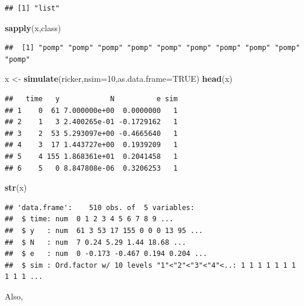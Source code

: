 \documentclass[]{article}
\newenvironment{Shaded}{\begin{snugshade}}{\end{snugshade}}
\newcommand{\KeywordTok}[1]{\textcolor[rgb]{0.13,0.29,0.53}{\textbf{#1}}}
\newcommand{\DataTypeTok}[1]{\textcolor[rgb]{0.13,0.29,0.53}{#1}}
\newcommand{\DecValTok}[1]{\textcolor[rgb]{0.00,0.00,0.81}{#1}}
\newcommand{\StringTok}[1]{\textcolor[rgb]{0.31,0.60,0.02}{#1}}
\newcommand{\OtherTok}[1]{\textcolor[rgb]{0.56,0.35,0.01}{#1}}
\newcommand{\NormalTok}[1]{#1}
\begin{document}
\begin{verbatim}
## [1] "list"
\end{verbatim}

\begin{Shaded}
\begin{Highlighting}[]
\KeywordTok{sapply}\NormalTok{(x,class)}
\end{Highlighting}
\end{Shaded}

\begin{verbatim}
##  [1] "pomp" "pomp" "pomp" "pomp" "pomp" "pomp" "pomp" "pomp" "pomp" "pomp"
\end{verbatim}

\begin{Shaded}
\begin{Highlighting}[]
\NormalTok{x <-}\StringTok{ }\KeywordTok{simulate}\NormalTok{(ricker,}\DataTypeTok{nsim=}\DecValTok{10}\NormalTok{,}\DataTypeTok{as.data.frame=}\OtherTok{TRUE}\NormalTok{)}
\KeywordTok{head}\NormalTok{(x)}
\end{Highlighting}
\end{Shaded}

\begin{verbatim}
##   time   y            N          e sim
## 1    0  61 7.000000e+00  0.0000000   1
## 2    1   3 2.400265e-01 -0.1729162   1
## 3    2  53 5.293097e+00 -0.4665640   1
## 4    3  17 1.443727e+00  0.1939209   1
## 5    4 155 1.868361e+01  0.2041458   1
## 6    5   0 8.847808e-06  0.3206253   1
\end{verbatim}

\begin{Shaded}
\begin{Highlighting}[]
\KeywordTok{str}\NormalTok{(x)}
\end{Highlighting}
\end{Shaded}

\begin{verbatim}
## 'data.frame':    510 obs. of  5 variables:
##  $ time: num  0 1 2 3 4 5 6 7 8 9 ...
##  $ y   : num  61 3 53 17 155 0 0 0 13 95 ...
##  $ N   : num  7 0.24 5.29 1.44 18.68 ...
##  $ e   : num  0 -0.173 -0.467 0.194 0.204 ...
##  $ sim : Ord.factor w/ 10 levels "1"<"2"<"3"<"4"<..: 1 1 1 1 1 1 1 1 1 1 ...
\end{verbatim}


Also,
\end{document}
